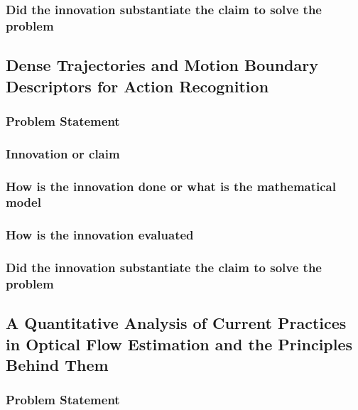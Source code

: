 \documentclass[10pt,twocolumn,letterpaper]{article}
\begin{document}
\subsubsection{Did the innovation substantiate the claim to solve the problem}
\lipsum[1]

\subsection{Dense Trajectories and Motion Boundary Descriptors for Action Recognition ~\cite{wang2013dense}}

\subsubsection{Problem Statement}
\lipsum[1]

\subsubsection{Innovation or claim}
\lipsum[1]

\subsubsection{How is the innovation done or what is the mathematical model}
\lipsum[1]

\subsubsection{How is the innovation evaluated}
\lipsum[1]

\subsubsection{Did the innovation substantiate the claim to solve the problem}
\lipsum[1]

\subsection{A Quantitative Analysis of Current Practices in Optical Flow Estimation and the Principles Behind Them ~\cite{sun2014quantitative}}

\subsubsection{Problem Statement}
\lipsum[1]
\end{document}
